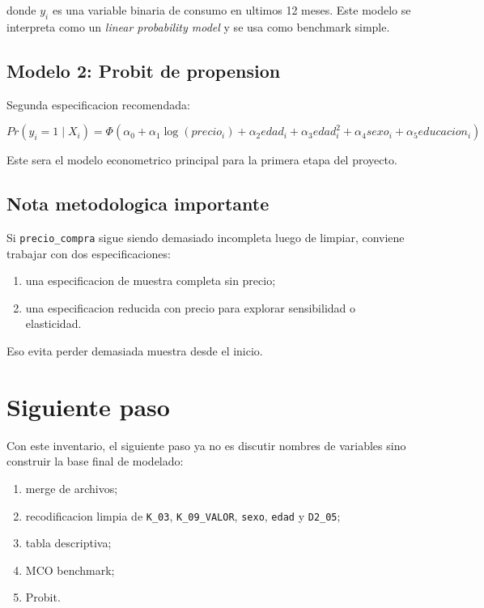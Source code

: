 \documentclass[11pt]{article}
\begin{document}
donde \(y_i\) es una variable binaria de consumo en ultimos 12 meses.
Este modelo se interpreta como un \textit{linear probability model} y se usa como benchmark simple.

\subsection{Modelo 2: Probit de propension}

Segunda especificacion recomendada:

\[
    Pr(y_i = 1 \mid X_i) = \Phi(\alpha_0 + \alpha_1 \log(precio_i) + \alpha_2 edad_i + \alpha_3 edad_i^2 + \alpha_4 sexo_i + \alpha_5 educacion_i)
\]

Este sera el modelo econometrico principal para la primera etapa del proyecto.

\subsection{Nota metodologica importante}

Si \texttt{precio\_compra} sigue siendo demasiado incompleta luego de limpiar, conviene trabajar con dos especificaciones:

\begin{enumerate}[leftmargin=*]
    \item una especificacion de muestra completa sin precio;
    \item una especificacion reducida con precio para explorar sensibilidad o elasticidad.
\end{enumerate}

Eso evita perder demasiada muestra desde el inicio.

\section{Siguiente paso}

Con este inventario, el siguiente paso ya no es discutir nombres de variables sino construir la base final de modelado:

\begin{enumerate}[leftmargin=*]
    \item merge de archivos;
    \item recodificacion limpia de \texttt{K\_03}, \texttt{K\_09\_VALOR}, \texttt{sexo}, \texttt{edad} y \texttt{D2\_05};
    \item tabla descriptiva;
    \item MCO benchmark;
    \item Probit.
\end{enumerate}
\end{document}

